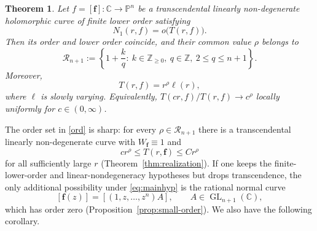 \documentclass[12pt,letterpaper,reqno]{amsart}
\newtheorem{thm}{Theorem}[section]
\theoremstyle{definition}
\numberwithin{equation}{section}
\newcommand{\C}{\mathbb C}
\newcommand{\Z}{\mathbb Z}
\newcommand{\PP}{\mathbb P}
\newcommand{\fv}{\bm f}
\begin{document}
\begin{thm}\label{thm:main}
Let $f=[\fv]:\C\to\PP^{n}$ be a transcendental linearly non-degenerate
holomorphic curve of finite lower order satisfying
\begin{equation}\label{eq:mainhyp}
 N_1(r,f)=o\bigl(T(r,f)\bigr).
\end{equation}
Then its order and lower order coincide, and their common value $\rho$
belongs to
\begin{equation}\label{ord}
 \mathcal R_{n+1}:=\left\{1+\frac{k}{q}:\ k\in\Z_{\geq0},\
                           q\in\Z,\ 2\leq q\leq n+1\right\}.
\end{equation}
Moreover,
\begin{equation}\label{reg}
 T(r,f)=r^\rho\ell(r),
\end{equation}
where $\ell$ is slowly varying. Equivalently,
$T(cr,f)/T(r,f)\to c^\rho$ locally uniformly for $c\in(0,\infty)$.
\end{thm}


The order set in \eqref{ord} is sharp: for every
\(\rho\in\mathcal R_{n+1}\) there is a transcendental linearly
non-degenerate curve with \(W_{\fv}\equiv1\) and
\[
 c r^\rho\le T(r,\fv)\le C r^\rho
\]
for all sufficiently large \(r\) (Theorem~\ref{thm:realization}).
If one keeps the finite-lower-order and linear-nondegeneracy hypotheses
but drops transcendence, the only additional possibility under
\eqref{eq:mainhyp} is the rational normal curve
\[
 [\fv(z)]=[(1,z,\ldots,z^{n})A],
 \qquad A\in\operatorname{GL}_{n+1}(\mathbb C),
\]
which has order zero (Proposition~\ref{prop:small-order}).
We also have the following corollary.

\end{document}
